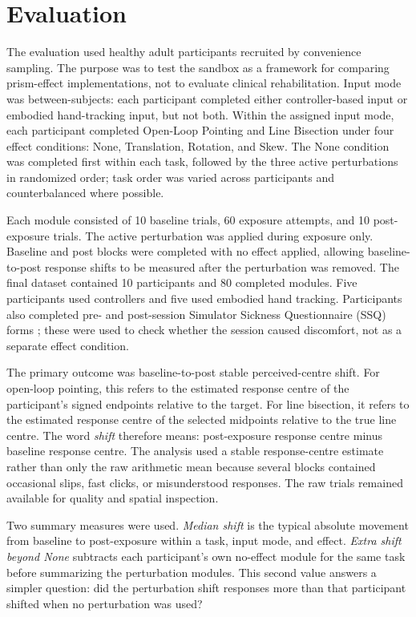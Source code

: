 \section*{Evaluation}

The evaluation used healthy adult participants recruited by convenience sampling. The purpose was to test the sandbox as a framework for comparing prism-effect implementations, not to evaluate clinical rehabilitation. Input mode was between-subjects: each participant completed either controller-based input or embodied hand-tracking input, but not both. Within the assigned input mode, each participant completed Open-Loop Pointing and Line Bisection under four effect conditions: None, Translation, Rotation, and Skew. The None condition was completed first within each task, followed by the three active perturbations in randomized order; task order was varied across participants and counterbalanced where possible.

Each module consisted of 10 baseline trials, 60 exposure attempts, and 10 post-exposure trials. The active perturbation was applied during exposure only. Baseline and post blocks were completed with no effect applied, allowing baseline-to-post response shifts to be measured after the perturbation was removed. The final dataset contained 10 participants and 80 completed modules. Five participants used controllers and five used embodied hand tracking. Participants also completed pre- and post-session Simulator Sickness Questionnaire (SSQ) forms \cite{KennedySSQ}; these were used to check whether the session caused discomfort, not as a separate effect condition.

The primary outcome was baseline-to-post stable perceived-centre shift. For open-loop pointing, this refers to the estimated response centre of the participant's signed endpoints relative to the target. For line bisection, it refers to the estimated response centre of the selected midpoints relative to the true line centre. The word \emph{shift} therefore means: post-exposure response centre minus baseline response centre. The analysis used a stable response-centre estimate rather than only the raw arithmetic mean because several blocks contained occasional slips, fast clicks, or misunderstood responses. The raw trials remained available for quality and spatial inspection.

Two summary measures were used. \emph{Median shift} is the typical absolute movement from baseline to post-exposure within a task, input mode, and effect. \emph{Extra shift beyond None} subtracts each participant's own no-effect module for the same task before summarizing the perturbation modules. This second value answers a simpler question: did the perturbation shift responses more than that participant shifted when no perturbation was used?

